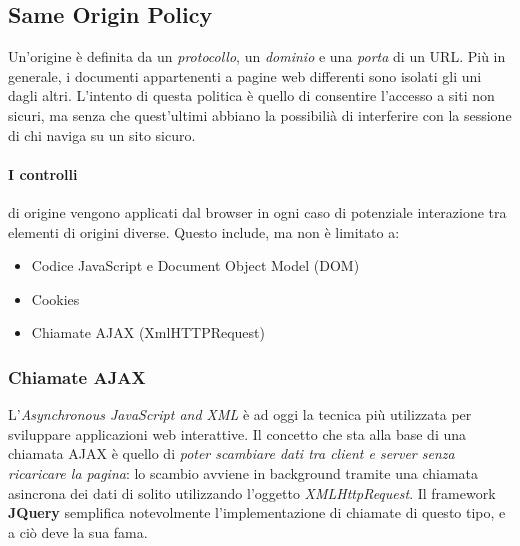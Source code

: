 \subsection{Same Origin Policy}
Un'origine è definita da un \textit{protocollo}, un \textit{dominio} e una \textit{porta} di un URL. Più in generale, i documenti appartenenti a pagine web differenti sono isolati gli uni dagli altri. L'intento di questa politica è quello di consentire l'accesso a siti non sicuri, ma senza che quest'ultimi abbiano la possibilià di interferire con la sessione di chi naviga su un sito sicuro. \cite{w3c:sop}

\paragraph{I controlli} di origine vengono applicati dal browser in ogni caso di potenziale interazione tra elementi di origini diverse. Questo include, ma non è limitato a:
\begin{itemize}
    \item Codice JavaScript e Document Object Model (DOM)
    \item Cookies
    \item Chiamate AJAX (XmlHTTPRequest)
\end{itemize}

\subsubsection{Chiamate AJAX}
L'\emph{Asynchronous JavaScript and XML} è ad oggi la tecnica più utilizzata per sviluppare applicazioni web interattive. Il concetto che sta alla base di una chiamata AJAX è quello di \textit{poter scambiare dati tra client e server senza ricaricare la pagina}: lo scambio avviene in background tramite una chiamata asincrona dei dati di solito utilizzando l’oggetto \textsl{XMLHttpRequest}. Il framework \textbf{JQuery} semplifica notevolmente l'implementazione di chiamate di questo tipo, e a ciò deve la sua fama.

